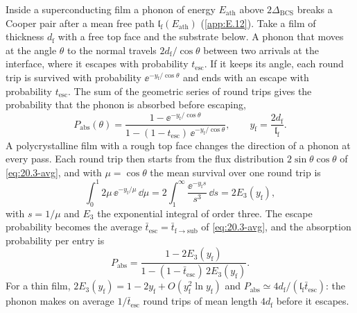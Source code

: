 Inside a superconducting film a phonon of energy $E_{\mathrm{ath}}$ above $2\Delta_{\mathrm{BCS}}$ breaks a Cooper pair after a mean free path $\mathfrak{l}_{\mathrm{f}}(E_{\mathrm{ath}})$ (\cref{app:E.12}). Take a film of thickness $d_{\mathrm{f}}$ with a free top face and the substrate below. A phonon that moves at the angle $\theta$ to the normal travels $2d_{\mathrm{f}}/\cos\theta$ between two arrivals at the interface, where it escapes with probability $t_{\mathrm{esc}}$. If it keeps its angle, each round trip is survived with probability $\ee^{-y_{\mathrm{f}}/\cos\theta}$ and ends with an escape with probability $t_{\mathrm{esc}}$. The sum of the geometric series of round trips gives the probability that the phonon is absorbed before escaping,
\begin{equation}
  P_{\mathrm{abs}}(\theta) = \frac{1 - \ee^{-y_{\mathrm{f}}/\cos\theta}}{1 - (1 - t_{\mathrm{esc}})\,\ee^{-y_{\mathrm{f}}/\cos\theta}} ,
  \qquad y_{\mathrm{f}} = \frac{2d_{\mathrm{f}}}{\mathfrak{l}_{\mathrm{f}}} .
  \label{eq:20.3-pabs-theta}
\end{equation}
A polycrystalline film with a rough top face changes the direction of a phonon at every pass. Each round trip then starts from the flux distribution $2\sin\theta\cos\theta$ of \cref{eq:20.3-avg}, and with $\mu = \cos\theta$ the mean survival over one round trip is
\begin{equation*}
  \int_0^1 2\mu\,\ee^{-y_{\mathrm{f}}/\mu}\,\dd\mu = 2\int_1^\infty\frac{\ee^{-y_{\mathrm{f}}s}}{s^3}\,\dd s = 2E_3(y_{\mathrm{f}}) ,
\end{equation*}
with $s = 1/\mu$ and $E_3$ the exponential integral of order three. The escape probability becomes the average $\bar t_{\mathrm{esc}} = \bar t_{\mathrm{f\to sub}}$ of \cref{eq:20.3-avg}, and the absorption probability per entry is
\begin{equation}
  P_{\mathrm{abs}} = \frac{1 - 2E_3(y_{\mathrm{f}})}{1 - (1 - \bar t_{\mathrm{esc}})\,2E_3(y_{\mathrm{f}})} .
  \label{eq:20.3-pabs}
\end{equation}
For a thin film, $2E_3(y_{\mathrm{f}}) = 1 - 2y_{\mathrm{f}} + O(y_{\mathrm{f}}^2\ln y_{\mathrm{f}})$ and $P_{\mathrm{abs}} \simeq 4d_{\mathrm{f}}/(\mathfrak{l}_{\mathrm{f}}\bar t_{\mathrm{esc}})$: the phonon makes on average $1/\bar t_{\mathrm{esc}}$ round trips of mean length $4d_{\mathrm{f}}$ before it escapes.

